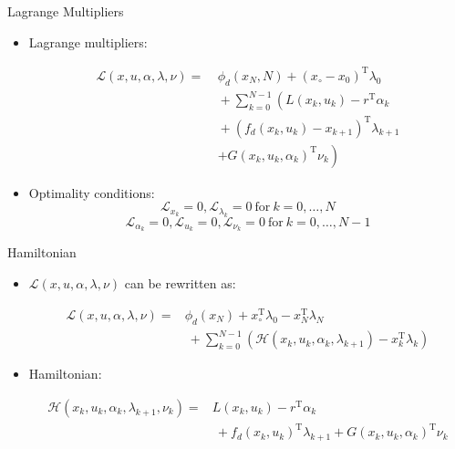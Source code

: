 \documentclass[]{beamer}
\providecommand{\tightlist}{%
  \setlength{\itemsep}{0pt}\setlength{\parskip}{0pt}}
\begin{document}
\begin{frame}{Lagrange Multipliers}

\begin{itemize}
\tightlist
\item
  Lagrange multipliers: \vspace{-5mm}

  \begin{align*}
  \mathcal{L}(x,u,\alpha,\lambda,\nu)= &\ \phi_d(x_N,N)+ (x_\circ-x_0)^\text{T}\lambda_0\\
          &\ +\sum_{k=0}^{N-1}\left(L(x_k,u_k)-r^\text{T}\alpha_{k} \right.\\
          &\ +(f_d(x_k,u_k)-x_{k+1})^\text{T}\lambda_{k+1}\\
          &\ \left.+G(x_k,u_k,\alpha_k)^\text{T} \nu_{k} \right)
  \end{align*}
\item
  Optimality conditions:
  \[\mathcal{L}_{x_k}=0, \mathcal{L}_{\lambda_k}=0\ \text{for}\ k=0,\ldots,N \]
  \[\mathcal{L}_{\alpha_{k}}=0, \mathcal{L}_{u_k}=0, \mathcal{L}_{\nu_k}=0\ \text{for}\  k=0,\ldots,N-1\]
\end{itemize}

\end{frame}

\begin{frame}{Hamiltonian}

\begin{itemize}
\tightlist
\item
  \(\mathcal{L}(x,u,\alpha,\lambda,\nu)\) can be rewritten as:
  \vspace{-5mm}

  \begin{align*}
  \mathcal{L}(x,u,\alpha,\lambda,\nu)= &\phi_d(x_N)+x_\circ^\text{T}\lambda_0-x_N^\text{T}\lambda_N\\
          &\ +\sum_{k=0}^{N-1}\left(\mathcal{H}(x_k,u_k,\alpha_k,\lambda_{k+1})-x_{k}^\text{T}\lambda_k\right)
  \end{align*}
\item
  Hamiltonian:

  \begin{align*}
  \mathcal{H}(x_k,u_k,\alpha_k,\lambda_{k+1},\nu_k)=&L(x_k,u_k)-r^\text{T}\alpha_{k}\\
          &\ +f_d(x_k,u_k)^\text{T}\lambda_{k+1}+G(x_k,u_k,\alpha_k)^\text{T} \nu_{k}
  \end{align*}
\end{itemize}

\end{frame}
\end{document}
